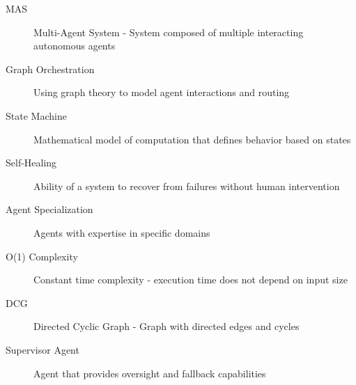 \begin{description}
    \item[MAS] Multi-Agent System - System composed of multiple interacting autonomous agents
    \item[Graph Orchestration] Using graph theory to model agent interactions and routing
    \item[State Machine] Mathematical model of computation that defines behavior based on states
    \item[Self-Healing] Ability of a system to recover from failures without human intervention
    \item[Agent Specialization] Agents with expertise in specific domains
    \item[O(1) Complexity] Constant time complexity - execution time does not depend on input size
    \item[DCG] Directed Cyclic Graph - Graph with directed edges and cycles
    \item[Supervisor Agent] Agent that provides oversight and fallback capabilities
\end{description}
